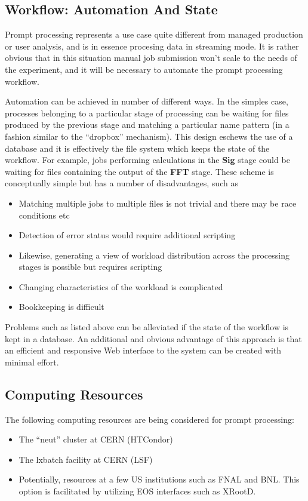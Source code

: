 \documentclass[pdftex,12pt,letter]{article}
\begin{document}
\subsection{Workflow: Automation And State}

Prompt processing represents a use case quite different from managed production or user analysis, and is 
in essence procesing data in streaming mode. It is rather obvious that in this situation manual job submission won't scale to the
needs of the experiment, and it will be necessary to automate the prompt processing workflow.

Automation can be achieved in  number of different ways. In the simples case, processes belonging to a particular stage
of processing can be waiting for files produced by the previous stage and matching a particular name pattern
(in a fashion similar to the ``dropbox'' mechanism). This design eschews the use of a database and it is effectively
the file system which keeps the state of the workflow. For example, jobs performing calculations in the \textbf{Sig}
stage could be waiting for files containing the output of the \textbf{FFT} stage. These scheme is conceptually simple but has a number of
disadvantages, such as
\begin{itemize}
\item Matching multiple jobs to multiple files is not trivial and there may be race conditions etc
\item Detection of error status would require additional scripting
\item Likewise, generating a view of workload distribution across the processing stages is possible but requires
scripting
\item Changing characteristics of the workload is complicated
\item Bookkeeping is difficult
\end{itemize}

\noindent Problems such as listed above can be alleviated if the state of the workflow is kept in a database.
An additional and obvious advantage of this approach is that an efficient and responsive Web interface to
the system can be created with minimal effort.

\subsection{Computing Resources}
The following computing resources are being considered for prompt processing:
\begin{itemize}

\item The ``neut'' cluster  \cite{neut} at CERN (HTCondor)

\item The lxbatch facility \cite{lxbatch} at CERN (LSF)

\item Potentially, resources at a few US institutions such as FNAL and BNL.  This option is facilitated by utilizing EOS interfaces such as XRootD.

\end{itemize}
\end{document}
